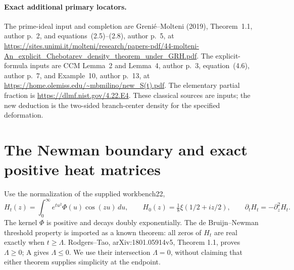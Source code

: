 \paragraph{Exact additional primary locators.}
The prime-ideal input and completion are Greni\'e--Molteni
(2019), Theorem~1.1, author p.~2, and equations~(2.5)--(2.8),
author p.~5, at
\url{https://sites.unimi.it/molteni/research/papers-pdf/44-molteni-An_explicit_Chebotarev_density_theorem_under_GRH.pdf}.
The explicit-formula inputs are CCM Lemma~2 and Lemma~4,
author p.~3, equation~(4.6), author p.~7, and Example~10,
author p.~13, at
\url{https://home.olemiss.edu/~mbmilino/new_S(t).pdf}.
The elementary partial fraction is
\url{https://dlmf.nist.gov/4.22.E4}.
These classical sources are inputs; the new deduction is the
two-sided branch-center density for the specified deformation.


\section{The Newman boundary and exact positive heat matrices}

Use the normalization of the supplied workbench22,
\[
 H_t(z)=\int_0^\infty e^{tu^2}\Phi(u)\cos(zu)\,du,
 \qquad H_0(z)=\tfrac18\xi(1/2+iz/2),
 \qquad \partial_tH_t=-\partial_z^2H_t.
\]
The kernel $\Phi$ is positive and decays doubly exponentially. The
de Bruijn--Newman threshold property is imported as a known theorem:
all zeros of $H_t$ are real exactly when $t\ge\Lambda$. Rodgers--Tao,
arXiv:1801.05914v5, Theorem 1.1, proves $\Lambda\ge0$; A gives
$\Lambda\le0$. We use their intersection $\Lambda=0$, without claiming
that either theorem supplies simplicity at the endpoint.

